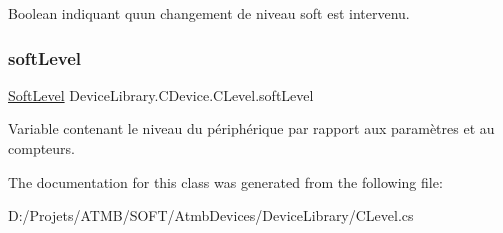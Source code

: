 Boolean indiquant qu\textquotesingle{}un changement de niveau soft est intervenu. 

\mbox{\label{class_device_library_1_1_c_device_1_1_c_level_ab128a2dee79a09876ed3564ac6e67ad8}} 
\subsubsection{\texorpdfstring{soft\+Level}{softLevel}}
{\footnotesize\ttfamily \mbox{\hyperlink{class_device_library_1_1_c_device_1_1_c_level_a83c2976bc299331f1c355e806299bb1f}{Soft\+Level}} Device\+Library.\+C\+Device.\+C\+Level.\+soft\+Level}



Variable contenant le niveau du périphérique par rapport aux paramètres et au compteurs. 



The documentation for this class was generated from the following file\+:\begin{DoxyCompactItemize}
\item 
D\+:/\+Projets/\+A\+T\+M\+B/\+S\+O\+F\+T/\+Atmb\+Devices/\+Device\+Library/C\+Level.\+cs\end{DoxyCompactItemize}
